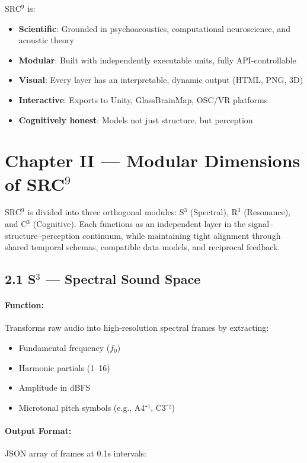 SRC$^{9}$ is:

\begin{itemize}
    \item \textbf{Scientific}: Grounded in psychoacoustics, computational neuroscience, and acoustic theory
    \item \textbf{Modular}: Built with independently executable units, fully API-controllable
    \item \textbf{Visual}: Every layer has an interpretable, dynamic output (HTML, PNG, 3D)
    \item \textbf{Interactive}: Exports to Unity, GlassBrainMap, OSC/VR platforms
    \item \textbf{Cognitively honest}: Models not just structure, but perception
\end{itemize}

\section*{Chapter II — Modular Dimensions of SRC$^{9}$}

SRC$^{9}$ is divided into three orthogonal modules: S$^{3}$ (Spectral), R$^{3}$ (Resonance), and C$^{3}$ (Cognitive). Each functions as an independent layer in the signal–structure–perception continuum, while maintaining tight alignment through shared temporal schemas, compatible data models, and reciprocal feedback.

\subsection*{2.1 S$^{3}$ — Spectral Sound Space}

\paragraph{Function:}  
Transforms raw audio into high-resolution spectral frames by extracting:

\begin{itemize}
  \item Fundamental frequency ($f_0$)
  \item Harmonic partials (1–16)
  \item Amplitude in dBFS
  \item Microtonal pitch symbols (e.g., A4⁺¹, C3⁻²)
\end{itemize}

\paragraph{Output Format:}  
JSON array of frames at 0.1s intervals:

